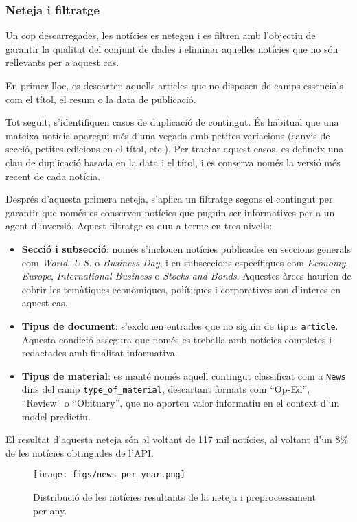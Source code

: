 \documentclass[12pt,a4paper,twoside]{book}
\begin{document}
\subsubsection*{Neteja i filtratge}

Un cop descarregades, les notícies es netegen i es filtren amb l'objectiu de garantir la qualitat del conjunt de dades i eliminar aquelles notícies que no són rellevants per a aquest cas.

En primer lloc, es descarten aquells articles que no disposen de camps essencials com el títol, el resum o la data de publicació.

Tot seguit, s'identifiquen casos de duplicació de contingut. És habitual que una mateixa notícia aparegui més d'una vegada amb petites variacions (canvis de secció, petites edicions en el títol, etc.). Per tractar aquest casos, es defineix una clau de duplicació basada en la data i el títol, i es conserva només la versió més recent de cada notícia.

Després d'aquesta primera neteja, s'aplica un filtratge segons el contingut per garantir que només es conserven notícies que puguin ser informatives per a un agent d'inversió. Aquest filtratge es duu a terme en tres nivells:

\begin{itemize}
    \item \textbf{Secció i subsecció}: només s'inclouen notícies publicades en seccions generals com \textit{World}, \textit{U.S.} o \textit{Business Day}, i en subseccions específiques com \textit{Economy}, \textit{Europe}, \textit{International Business} o \textit{Stocks and Bonds}. Aquestes àrees haurien de cobrir les temàtiques econòmiques, polítiques i corporatives son d'interes en aquest cas.

    \item \textbf{Tipus de document}: s'exclouen entrades que no siguin de tipus \texttt{article}. Aquesta condició assegura que només es treballa amb notícies completes i redactades amb finalitat informativa.

    \item \textbf{Tipus de material}: es manté només aquell contingut classificat com a \texttt{News} dins del camp \texttt{type\_of\_material}, descartant formats com “Op-Ed”, “Review” o “Obituary”, que no aporten valor informatiu en el context d'un model predictiu.
\end{itemize}

El resultat d'aquesta neteja són al voltant de 117 mil notícies, al voltant d'un 8\% de les notícies obtingudes de l'API.
\begin{figure}[H]
	\centering
	\texttt{[image: figs/news\_per\_year.png]}
	\caption{Distribució de les notícies resultants de la neteja i preprocessament per any.}
	\label{fig:context-anoni1}
\end{figure}
\end{document}
